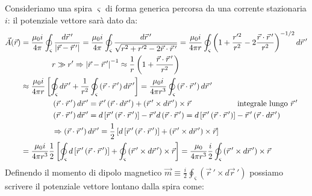 Consideriamo una spira $ \varsigma $ di forma generica percorsa da una corrente stazionaria $ i $: il potenziale vettore sarà dato da:
\begin{equation}
	\begin{split}
		\vec{A}(\vec{r}) &= \displaystyle\frac{\mu_0 i}{4\pi} \oint_{\varsigma} \displaystyle\frac{d\vec{r}\,'}{\left\lvert\vec{r} - \vec{r}\,'\right\rvert} = \displaystyle\frac{\mu_0 i}{4\pi} \oint_{\varsigma} \displaystyle\frac{d\vec{r}\,'}{\sqrt{r^2 + r'^2 - 2\vec{r}\cdot\vec{r}\,'}} = \displaystyle\frac{\mu_0 i}{4\pi r} \oint_{\varsigma} \left( 1 + \displaystyle\frac{r'^2}{r^2} - 2 \displaystyle\frac{\vec{r}\cdot\vec{r}\,'}{r^2} \right)^{-1/2} d\vec{r}\,' \\ 
				 & \qquad\qquad r \gg r' \Rightarrow \left\lvert\vec{r} - \vec{r}\,'\right\rvert^{-1} \approx \frac{1}{r} \left(1 + \frac{\vec{r}\cdot\vec{r}\,'}{r^2}\right) \\ 
				 &\approx \displaystyle\frac{\mu_0 i}{4\pi r} \left[ \oint_{\varsigma} d\vec{r}\,' + \displaystyle\frac{1}{r^2} \oint_{\varsigma} \left( \vec{r}\cdot\vec{r}\,' \right) d\vec{r}\,' \right] = \displaystyle\frac{\mu_0 i}{4\pi r^3} \oint_{\varsigma} \left( \vec{r}\cdot\vec{r}\,' \right) d\vec{r}\,' \\ 
				 & \qquad\qquad \left(\vec{r}\cdot\vec{r}\,'\right) d\vec{r}\,' = \vec{r}\,' \left(\vec{r}\cdot d\vec{r}\,'\right) + \left(\vec{r}\,'\times d\vec{r}\,'\right)\times\vec{r} \qquad \qquad \qquad \text{integrale lungo } \vec{r}\,' \\ 
				 & \qquad\qquad \left(\vec{r}\cdot\vec{r}\,'\right) d\vec{r}\,' = d\left[\vec{r}\,'\left(\vec{r}\cdot\vec{r}\,'\right)\right] - \vec{r}\,'d\left(\vec{r}\cdot\vec{r}\,'\right) = d\left[\vec{r}\,'\left(\vec{r}\cdot\vec{r}\,'\right)\right] - \vec{r}\,'\left(\vec{r}\cdot d\vec{r}\,'\right) \\ 
				 & \qquad \qquad \Rightarrow \left(\vec{r}\cdot\vec{r}\,'\right)d\vec{r}\,' = \frac{1}{2} \left[ d\left[ \vec{r}\,' \left(\vec{r}\cdot\vec{r}\,'\right)\right] + \left(\vec{r}\,' \times d\vec{r}\,'\right) \times\vec{r} \right] \\ 
				 &= \displaystyle\frac{\mu_0 i}{4\pi r^3} \displaystyle\frac{1}{2} \left[ \oint_{\varsigma} d\left[ \vec{r}\,' \left(\vec{r}\cdot\vec{r}\,'\right)\right] + \oint_{\varsigma} \left(\vec{r}\,' \times d\vec{r}\,'\right) \times\vec{r} \right] = \displaystyle\frac{\mu_0}{4\pi r^3} \displaystyle\frac{i}{2} \oint_{\varsigma} \left(\vec{r}\,' \times d\vec{r}\,'\right) \times\vec{r} 
	\end{split}
	\label{eq:pot-vett-sp}
\end{equation}
Definendo il momento di dipolo magnetico $ \vec{m} \equiv \frac{i}{2} \oint_{\varsigma} \left(\vec{r}\,'\times d\vec{r}\,'\right) $ possiamo scrivere il potenziale vettore lontano dalla spira come:
